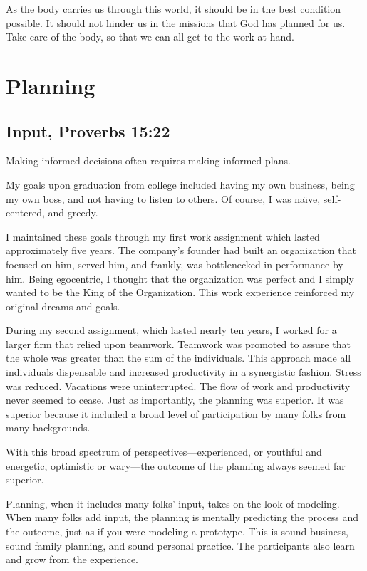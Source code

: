 \documentclass[12pt]{memoir}
\begin{document}
As the body carries us through this world, it should be in the best
condition possible. It should not hinder us in the missions that God
has planned for us. Take care of the body, so that we can all get
to the work at hand.

\section{Planning}


\subsection[Input]{Input, Proverbs 15:22}
 

Making informed decisions often requires making informed plans. 

My goals upon graduation from college included having my own business, being my own boss, and not having to listen to others. Of course, I was na\"{\i}ve, self-centered, and greedy.

I maintained these goals through my first work assignment which lasted approximately five years. The company's founder had built an organization that focused on him, served him, and frankly, was bottlenecked in performance by him. Being egocentric, I thought that the organization was perfect and I simply wanted to be the King of the Organization. This work experience reinforced my original dreams and goals. 

During my second assignment, which lasted nearly ten years, I worked for a larger firm that relied upon teamwork. Teamwork was promoted to assure that the whole was greater than the sum of the individuals.
This approach made all individuals dispensable and increased productivity in a synergistic fashion. Stress was reduced. Vacations were uninterrupted. The flow of work and productivity never seemed to cease. Just as importantly, the planning was superior. It was superior because it included a broad level of participation by many folks from many backgrounds.

With this broad spectrum of perspectives---experienced, or youthful and energetic, optimistic or wary---the outcome of the planning always seemed far superior.

Planning, when it includes many folks' input, takes on the look of
modeling. When many folks add input, the planning is mentally
predicting the process and the outcome, just as if you were modeling
a prototype. This is sound business, sound family planning, and sound
personal practice. The participants also learn and grow from the experience. 
\end{document}
